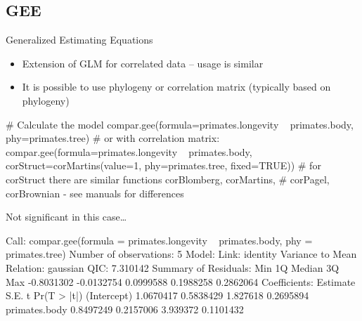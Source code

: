 \documentclass[compress, ucs, xelatex, 11pt, xcolor=svgnames,
  hyperref={
    bookmarks=true,
    unicode=true,
    colorlinks=true,
    pdftitle={Molecular data in R},
    plainpages=false,
    pdfauthor={Vojtech Zeisek},
    pdfsubject={Course about phylogeny and evolution in R},
    pdfcreator={XeLaTeX},
    pdfkeywords={R, evolution, phylogeny, molecular data},
    linkcolor=Tomato,
    anchorcolor=SaddleBrown,
    citecolor=Goldenrod,
    filecolor=DarkMagenta,
    menucolor=Sienna,
    urlcolor=DarkTurquoise,
    pdftex},
  url={hyphens, lowtilde} %
  ]{beamer}
\begin{document}
\subsection{GEE}

\begin{frame}[fragile]{Generalized Estimating Equations}
  \begin{itemize}
    \item Extension of GLM for correlated data -- usage is similar
    \item It is possible to use phylogeny or correlation matrix (typically based on phylogeny)
  \end{itemize}
  \begin{spluscode}
    # Calculate the model
    compar.gee(formula=primates.longevity ~ primates.body,
      phy=primates.tree)
    # or with correlation matrix:
    compar.gee(formula=primates.longevity ~ primates.body,
      corStruct=corMartins(value=1, phy=primates.tree, fixed=TRUE))
    # for corStruct there are similar functions corBlomberg, corMartins,
    # corPagel, corBrownian - see manuals for differences
  \end{spluscode}
\end{frame}

\begin{frame}[fragile]{Not significant in this case\ldots}
  \begin{spluscode}
    Call: compar.gee(formula = primates.longevity ~
      primates.body, phy = primates.tree)
    Number of observations:  5
    Model:
                         Link: identity
    Variance to Mean Relation: gaussian
    QIC: 7.310142
    Summary of Residuals:
           Min         1Q     Median         3Q        Max
    -0.8031302 -0.0132754  0.0999588  0.1988258  0.2862064
    Coefficients:
                   Estimate      S.E.        t Pr(T > |t|)
    (Intercept)   1.0670417 0.5838429 1.827618   0.2695894
    primates.body 0.8497249 0.2157006 3.939372   0.1101432
  \end{spluscode}
\end{frame}

%
\end{document}
